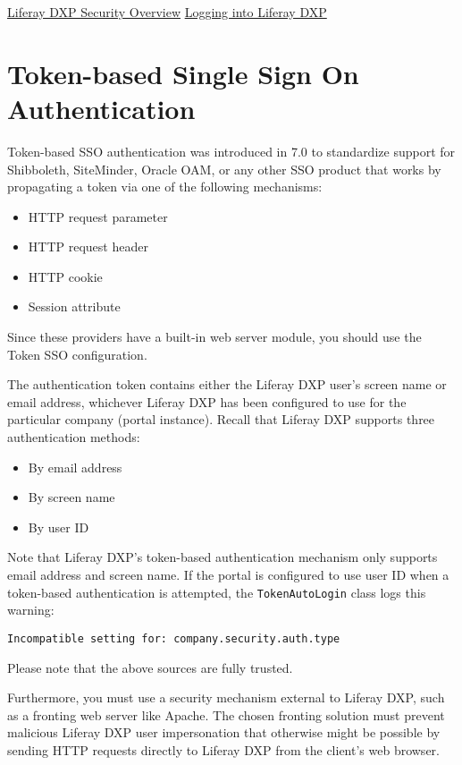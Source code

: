 \href{/docs/7-0/deploy/-/knowledge_base/d/liferay-portal-security-overview}{Liferay
DXP Security Overview}
\href{/docs/7-0/deploy/-/knowledge_base/d/logging-in-to-liferay}{Logging
into Liferay DXP}

\section{Token-based Single Sign On
Authentication}\label{token-based-single-sign-on-authentication}

Token-based SSO authentication was introduced in 7.0 to standardize
support for Shibboleth, SiteMinder, Oracle OAM, or any other SSO product
that works by propagating a token via one of the following mechanisms:

\begin{itemize}
\tightlist
\item
  HTTP request parameter
\item
  HTTP request header
\item
  HTTP cookie
\item
  Session attribute
\end{itemize}

Since these providers have a built-in web server module, you should use
the Token SSO configuration.

The authentication token contains either the Liferay DXP user's screen
name or email address, whichever Liferay DXP has been configured to use
for the particular company (portal instance). Recall that Liferay DXP
supports three authentication methods:

\begin{itemize}
\tightlist
\item
  By email address
\item
  By screen name
\item
  By user ID
\end{itemize}

Note that Liferay DXP's token-based authentication mechanism only
supports email address and screen name. If the portal is configured to
use user ID when a token-based authentication is attempted, the
\texttt{TokenAutoLogin} class logs this warning:

\begin{verbatim}
Incompatible setting for: company.security.auth.type
\end{verbatim}

Please note that the above sources are fully trusted.

Furthermore, you must use a security mechanism external to Liferay DXP,
such as a fronting web server like Apache. The chosen fronting solution
must prevent malicious Liferay DXP user impersonation that otherwise
might be possible by sending HTTP requests directly to Liferay DXP from
the client's web browser.

